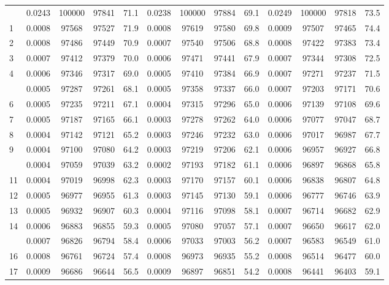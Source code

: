 \documentclass[
  14pt,
]{article}
\begin{document}
\begin{longtable}[t]{lcccccccccccc}
\endfoot
\bottomrule
\endlastfoot
0 & 0.0243 & 100000 & 97841 & 71.1 & 0.0238 & 100000 & 97884 & 69.1 & 0.0249 & 100000 & 97818 & 73.5\\
1 & 0.0008 & 97568 & 97527 & 71.9 & 0.0008 & 97619 & 97580 & 69.8 & 0.0009 & 97507 & 97465 & 74.4\\
2 & 0.0008 & 97486 & 97449 & 70.9 & 0.0007 & 97540 & 97506 & 68.8 & 0.0008 & 97422 & 97383 & 73.4\\
3 & 0.0007 & 97412 & 97379 & 70.0 & 0.0006 & 97471 & 97441 & 67.9 & 0.0007 & 97344 & 97308 & 72.5\\
4 & 0.0006 & 97346 & 97317 & 69.0 & 0.0005 & 97410 & 97384 & 66.9 & 0.0007 & 97271 & 97237 & 71.5\\
\addlinespace
5 & 0.0005 & 97287 & 97261 & 68.1 & 0.0005 & 97358 & 97337 & 66.0 & 0.0007 & 97203 & 97171 & 70.6\\
6 & 0.0005 & 97235 & 97211 & 67.1 & 0.0004 & 97315 & 97296 & 65.0 & 0.0006 & 97139 & 97108 & 69.6\\
7 & 0.0005 & 97187 & 97165 & 66.1 & 0.0003 & 97278 & 97262 & 64.0 & 0.0006 & 97077 & 97047 & 68.7\\
8 & 0.0004 & 97142 & 97121 & 65.2 & 0.0003 & 97246 & 97232 & 63.0 & 0.0006 & 97017 & 96987 & 67.7\\
9 & 0.0004 & 97100 & 97080 & 64.2 & 0.0003 & 97219 & 97206 & 62.1 & 0.0006 & 96957 & 96927 & 66.8\\
\addlinespace
10 & 0.0004 & 97059 & 97039 & 63.2 & 0.0002 & 97193 & 97182 & 61.1 & 0.0006 & 96897 & 96868 & 65.8\\
11 & 0.0004 & 97019 & 96998 & 62.3 & 0.0003 & 97170 & 97157 & 60.1 & 0.0006 & 96838 & 96807 & 64.8\\
12 & 0.0005 & 96977 & 96955 & 61.3 & 0.0003 & 97145 & 97130 & 59.1 & 0.0006 & 96777 & 96746 & 63.9\\
13 & 0.0005 & 96932 & 96907 & 60.3 & 0.0004 & 97116 & 97098 & 58.1 & 0.0007 & 96714 & 96682 & 62.9\\
14 & 0.0006 & 96883 & 96855 & 59.3 & 0.0005 & 97080 & 97057 & 57.1 & 0.0007 & 96650 & 96617 & 62.0\\
\addlinespace
15 & 0.0007 & 96826 & 96794 & 58.4 & 0.0006 & 97033 & 97003 & 56.2 & 0.0007 & 96583 & 96549 & 61.0\\
16 & 0.0008 & 96761 & 96724 & 57.4 & 0.0008 & 96973 & 96935 & 55.2 & 0.0008 & 96514 & 96477 & 60.0\\
17 & 0.0009 & 96686 & 96644 & 56.5 & 0.0009 & 96897 & 96851 & 54.2 & 0.0008 & 96441 & 96403 & 59.1\\

\end{longtable}
\end{document}
